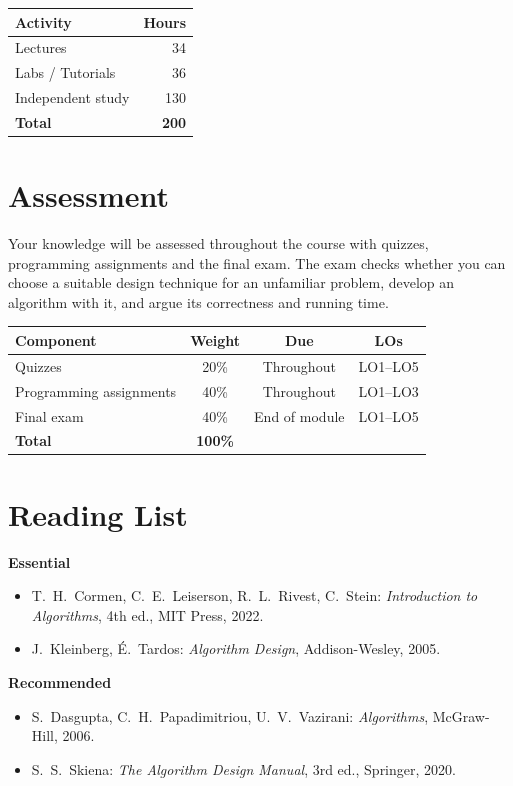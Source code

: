 \documentclass[11pt,a4paper]{article}
\begin{document}
\begin{tabularx}{0.6\textwidth}{X r}
\toprule
\textbf{Activity} & \textbf{Hours} \\
\midrule
Lectures            & 34 \\
Labs / Tutorials    & 36 \\
Independent study   & 130 \\
\midrule
\textbf{Total}      & \textbf{200} \\
\bottomrule
\end{tabularx}

\section{Assessment}
Your knowledge will be assessed throughout the course with quizzes, programming
assignments and the final exam. The exam checks whether you can choose a suitable
design technique for an unfamiliar problem, develop an algorithm with it, and argue
its correctness and running time.

\begin{tabularx}{\textwidth}{X c c c}
\toprule
\textbf{Component} & \textbf{Weight} & \textbf{Due} & \textbf{LOs} \\
\midrule
Quizzes & 20\% & Throughout & LO1--LO5 \\
Programming assignments & 40\% & Throughout & LO1--LO3 \\
Final exam & 40\% & End of module & LO1--LO5 \\
\midrule
\textbf{Total} & \textbf{100\%} & & \\
\bottomrule
\end{tabularx}

\section{Reading List}
\textbf{Essential}
\begin{itemize}
  \item T.\ H.\ Cormen, C.\ E.\ Leiserson, R.\ L.\ Rivest, C.\ Stein: \textit{Introduction to Algorithms}, 4th ed., MIT Press, 2022.
  \item J.\ Kleinberg, \'E.\ Tardos: \textit{Algorithm Design}, Addison-Wesley, 2005.
\end{itemize}
\textbf{Recommended}
\begin{itemize}
  \item S.\ Dasgupta, C.\ H.\ Papadimitriou, U.\ V.\ Vazirani: \textit{Algorithms}, McGraw-Hill, 2006.
  \item S.\ S.\ Skiena: \textit{The Algorithm Design Manual}, 3rd ed., Springer, 2020.
\end{itemize}
\end{document}
